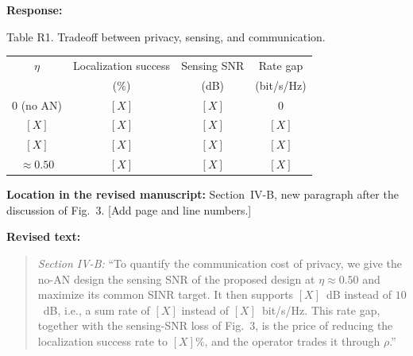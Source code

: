 \documentclass[a4paper,12pt]{article}
\newenvironment{response}{\par\textbf{Response:}\par}{\par}
\newcommand{\revisionlocation}[1]{\par\textbf{Location in the revised manuscript:} #1\par}
\newenvironment{revisedtext}{%
  \par\textbf{Revised text:}\begin{quote}\color{red}
}{\end{quote}}
\begin{document}
\begin{response}
\begin{center}
\small
Table R1. Tradeoff between privacy, sensing, and communication.\\[0.3em]
\begin{tabular}{cccc}
\hline
$\eta$ & Localization success & Sensing SNR & Rate gap\\
 & (\%) & (dB) & (bit/s/Hz)\\
\hline
$0$ (no AN) & $[X]$ & $[X]$ & $0$\\
$[X]$ & $[X]$ & $[X]$ & $[X]$\\
$[X]$ & $[X]$ & $[X]$ & $[X]$\\
$\approx0.50$ & $[X]$ & $[X]$ & $[X]$\\
\hline
\end{tabular}
\end{center}
\end{response}
\revisionlocation{Section~IV-B, new paragraph after the discussion of
Fig.~3. [Add page and line numbers.]}
\begin{revisedtext}
\textit{Section IV-B:} ``To quantify the communication cost of privacy, we
give the no-AN design the sensing SNR of the proposed design at
$\eta\approx0.50$ and maximize its common SINR target. It then supports
$[X]$~dB instead of $10$~dB, i.e., a sum rate of $[X]$ instead of
$[X]$~bit/s/Hz. This rate gap, together with the sensing-SNR loss of
Fig.~3, is the price of reducing the localization success rate to $[X]\%$,
and the operator trades it through $\rho$.''
\end{revisedtext}
\end{document}
